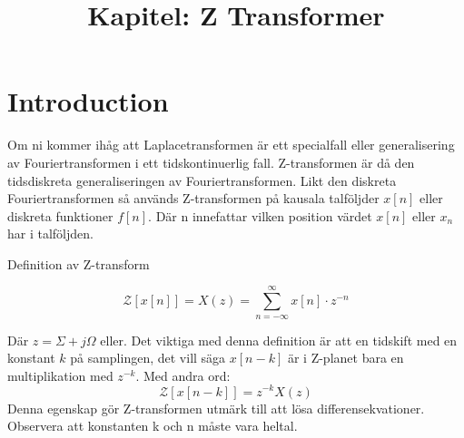 \documentclass{article}
\title{Kapitel: Z Transformer}
\begin{document}
\maketitle

\section{Introduction}

Om ni kommer ihåg att Laplacetransformen är ett specialfall eller generalisering av Fouriertransformen i ett
tidskontinuerlig fall. Z-transformen är då den tidsdiskreta generaliseringen av Fouriertransformen.
Likt den diskreta Fouriertransformen så används Z-transformen på kausala talföljder $x[n]$ eller
diskreta funktioner $f[n]$. Där n innefattar vilken position värdet $x[n]$ eller $x_n$ har i talföljden.

Definition av Z-transform

$$\mathcal{Z}[x[n]] = X(z) = \sum_{n=-\infty}^{\infty} x[n] \cdot z^{-n} $$

Där $z = \Sigma + j\Omega$ eller. %
Det viktiga med denna definition är att en tidskift med en konstant $k$ på samplingen, det vill säga $x[n-k]$ är i
Z-planet bara en multiplikation med $z^{-k}$. Med andra ord:
$$\mathcal{Z}[x[n-k]] = z^{-k} X(z) $$
Denna egenskap gör Z-transformen utmärk till att lösa differensekvationer. Observera att konstanten k och n
måste vara heltal.

\appendix
\end{document}
